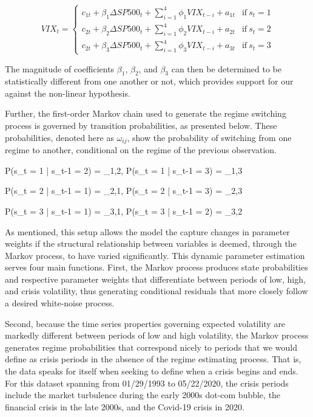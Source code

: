 \documentclass[11pt,a4paper,oldfontcommands]{memoir}
\begin{document}
{$$ VIX_{t} = 
\begin{cases}
      c_{1t} + \beta_{1} \Delta SP500_{t} + \sum_{i=1}^{4}\phi_{1} VIX_{t-i} +  a_{1t} & \text{if}\ s_t=1 \\
      c_{2t} + \beta_{2} \Delta SP500_{t} + \sum_{i=1}^{4}\phi_{2} VIX_{t-i} +  a_{2t} & \text{if}\ s_t=2 \\
      c_{2t} + \beta_{3} \Delta SP500_{t} + \sum_{i=1}^{4}\phi_{3} VIX_{t-i} +  a_{3t} & \text{if}\ s_t=3 
    \end{cases}
$$
\vspace{}
\begin{flushleft}
The magnitude of coefficients $\beta_{1}$, $\beta_{2}$, and $\beta_{3}$ can then be determined to be statistically different from one another or not, which provides support for our against the non-linear hypothesis.
\end{flushleft}

Further, the first-order Markov chain used to generate the regime switching process is governed by transition probabilities, as presented below. These probabilities, denoted here as $\omega_{ij}$, show the probability of switching from one regime to another, conditional on the regime of the previous observation. 

\begin{center}

P(s_{t} = 1 | s_{t-1} = 2) = \omega_{1,2}, \quad\quad P(s_{t} = 1 | s_{t-1} = 3) = \omega_{1,3}

P(s_{t} = 2 | s_{t-1} = 1) = \omega_{2,1}, \quad\quad P(s_{t} = 2 | s_{t-1} = 3) = \omega_{2,3}

P(s_{t} = 3 | s_{t-1} = 1) = \omega_{3,1}, \quad\quad P(s_{t} = 3 | s_{t-1} = 2) = \omega_{3,2}

\end{center}

\begin{flushleft}
As mentioned, this setup allows the model the capture changes in parameter weights if the structural relationship between variables is deemed, through the Markov process, to have varied significantly. This dynamic parameter estimation serves four main functions. First, the Markov process produces state probabilities and respective parameter weights that differentiate between periods of low, high, and crisis volatility, thus generating conditional residuals that more closely follow a desired white-noise process. 
\end{flushleft}

Second, because the time series properties governing expected volatility are markedly different between periods of low and high volatility, the Markov process generates regime probabilities that correspond nicely to periods that we would define as crisis periods in the absence of the regime estimating process. That is, the data speaks for itself when seeking to define when a crisis begins and ends. For this dataset spanning from 01/29/1993 to 05/22/2020, the crisis periods include the market turbulence during the early 2000s dot-com bubble, the financial crisis in the late 2000s, and the Covid-19 crisis in 2020. 

}
\end{document}
